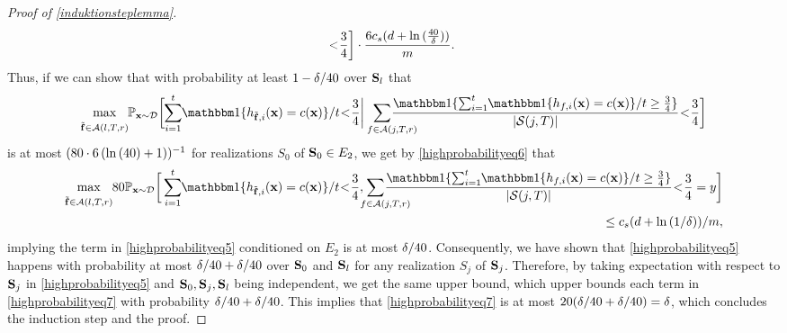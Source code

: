 \begin{proof}[Proof of \cref{induktionsteplemma}]
\begin{align}
       \negmedspace<\negmedspace\frac{3}{4}\bigg]\cdot\frac{6c_s(d+\ln{(\frac{40}{\delta} )})}{m}.\nonumber
    \end{align}
Thus, if we can show that with probability at least $1-\delta/40$ over $\mathbf{S}_{l}$ that 
\begin{align*}
  \max_{\stackrel{}{\rf\in\cA(l,T,r)}} \negmedspace \p_{\rx\sim \cD}
  \bigg[
  \negmedspace \sum_{i=1}^{t}\negmedspace  \ind\{h_{\rf,i}(\rx)=c(\rx)\}/t\negmedspace <\negmedspace \frac{3}{4}\bigg |
   \negmedspace  \negmedspace \negmedspace  \negmedspace \negmedspace \negmedspace \negmedspace\sum_{\text{\quad\quad}f\in \cA(j,T,r)} \negmedspace \negmedspace \negmedspace \negmedspace\negmedspace \negmedspace  \negmedspace \negmedspace \negmedspace \negmedspace \frac{\ind\{\sum_{i=1}^{t}\negmedspace  \ind\{h_{f,i}(\rx)=c(\rx)\}/t\geq \frac{3}{4}\}}{|\cS(j,T)|}
   \negmedspace<\negmedspace\frac{3}{4}\bigg] 
\end{align*}
is at most $(80\cdot 6 \left(\ln{\left(40\right)}+1\right))^{-1}$ for realizations $ S_{0} $ of  $\mathbf{S}_{0}\in E_{2}$, we get by \cref{highprobabilityeq6} that 
\begin{align*}
  \max_{\stackrel{}{\rf\in\cA(l,T,r)}} \negmedspace   80\p_{\rx\sim \cD}
  \bigg[ \sum_{i=1}^{t}\negmedspace  \ind\{h_{\rf,i}(\rx)=c(\rx)\}/t\negmedspace <\negmedspace \frac{3}{4},
  \negmedspace \negmedspace  \negmedspace  \negmedspace \negmedspace  \negmedspace \negmedspace \negmedspace \negmedspace\sum_{\text{\quad\quad}f\in \cA(j,T,r)} \negmedspace \negmedspace \negmedspace \negmedspace\negmedspace \negmedspace  \negmedspace \negmedspace \negmedspace \negmedspace \frac{\ind\{\sum_{i=1}^{t}\negmedspace  \ind\{h_{f,i}(\rx)=c(\rx)\}/t\geq \frac{3}{4}\}}{|\cS(j,T)|}\negmedspace <\negmedspace \frac{3}{4}=y
  \bigg]
  \\ 
  \leq \cs(d+\ln{\left(1/\delta \right)})/m,
\end{align*}
implying the term in \cref{highprobabilityeq5} conditioned on $ E_{2} $  is at most $\delta/40$. Consequently, we have shown that \cref{highprobabilityeq5} happens with probability at most $\delta/40+\delta/40$ over $\mathbf{S}_0$ and $ \mathbf{S}_{l}$ for any realization $S_{j}$ of $\mathbf{S}_{j}$. Therefore, by taking expectation with respect to $\mathbf{S}_{j}$ in \cref{highprobabilityeq5} and $ \mathbf{S}_{0},\mathbf{S}_{j},\mathbf{S}_{l} $ being independent,  we get the same upper bound, which upper bounds each term in \cref{highprobabilityeq7} with probability $ \delta/40+\delta/40 $. This implies that \cref{highprobabilityeq7} is at most $20(\delta/40+\delta/40)=\delta$, which concludes the induction step and the proof. 


\end{proof}
